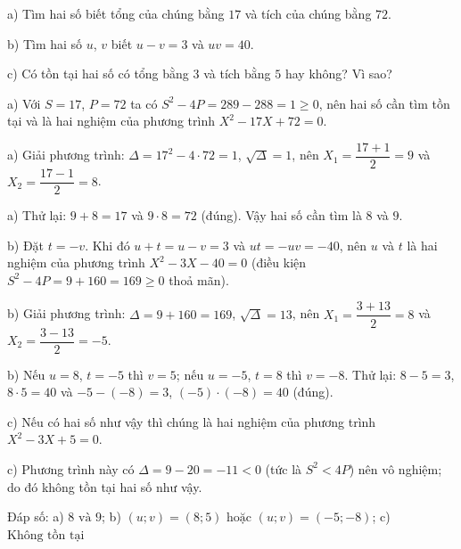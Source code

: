 \begin{problem}[9DS-PT2-006]
a) Tìm hai số biết tổng của chúng bằng $17$ và tích của chúng bằng $72$.

b) Tìm hai số $u$, $v$ biết $u - v = 3$ và $uv = 40$.

c) Có tồn tại hai số có tổng bằng $3$ và tích bằng $5$ hay không? Vì sao?

\begin{solution}
a) Với $S = 17$, $P = 72$ ta có $S^2 - 4P = 289 - 288 = 1 \geq 0$, nên hai số cần tìm tồn tại và là hai nghiệm của phương trình $X^2 - 17X + 72 = 0$.

a) Giải phương trình: $\Delta = 17^2 - 4 \cdot 72 = 1$, $\sqrt{\Delta} = 1$, nên $X_1 = \dfrac{17 + 1}{2} = 9$ và $X_2 = \dfrac{17 - 1}{2} = 8$.

a) Thử lại: $9 + 8 = 17$ và $9 \cdot 8 = 72$ (đúng). Vậy hai số cần tìm là $8$ và $9$.

b) Đặt $t = -v$. Khi đó $u + t = u - v = 3$ và $ut = -uv = -40$, nên $u$ và $t$ là hai nghiệm của phương trình $X^2 - 3X - 40 = 0$ (điều kiện $S^2 - 4P = 9 + 160 = 169 \geq 0$ thoả mãn).

b) Giải phương trình: $\Delta = 9 + 160 = 169$, $\sqrt{\Delta} = 13$, nên $X_1 = \dfrac{3 + 13}{2} = 8$ và $X_2 = \dfrac{3 - 13}{2} = -5$.

b) Nếu $u = 8$, $t = -5$ thì $v = 5$; nếu $u = -5$, $t = 8$ thì $v = -8$. Thử lại: $8 - 5 = 3$, $8 \cdot 5 = 40$ và $-5 - (-8) = 3$, $(-5) \cdot (-8) = 40$ (đúng).

c) Nếu có hai số như vậy thì chúng là hai nghiệm của phương trình $X^2 - 3X + 5 = 0$.

c) Phương trình này có $\Delta = 9 - 20 = -11 < 0$ (tức là $S^2 < 4P$) nên vô nghiệm; do đó không tồn tại hai số như vậy.

Đáp số: a) $\boxed{8 \text{ và } 9}$; b) $\boxed{(u; v) = (8; 5) \text{ hoặc } (u; v) = (-5; -8)}$; c) $\boxed{\text{Không tồn tại}}$
\end{solution}
\end{problem}

